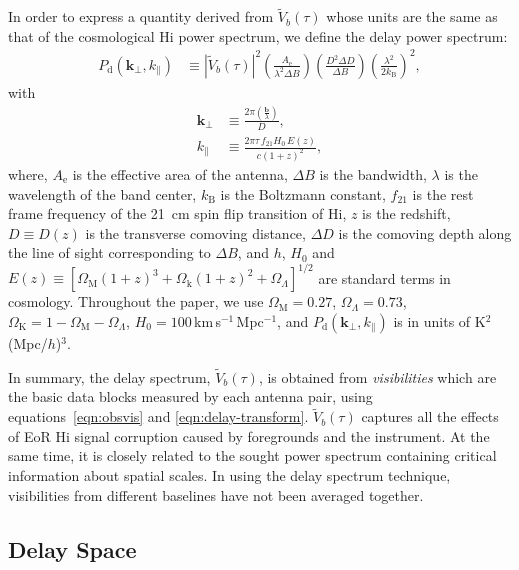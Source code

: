 \documentclass[preprint2,iop,numberedappendix,twocolappendix,appendixfloats]{emulateapj}
\begin{document}
In order to express a quantity derived from $\tilde{V}_b(\tau)$ whose units are the same as that of the cosmological H{\sc i} power spectrum, we define the delay power spectrum:
\begin{align}\label{eqn:delay-power-spectrum}
  P_\textrm{d}(\boldsymbol{k}_\perp,k_\parallel) &\equiv |\tilde{V}_b(\tau)|^2\left(\frac{A_\textrm{e}}{\lambda^2\Delta B}\right)\left(\frac{D^2\Delta D}{\Delta B}\right)\left(\frac{\lambda^2}{2k_\textrm{B}}\right)^2,
\end{align}
with
\begin{align}
  \boldsymbol{k}_\perp &\equiv \frac{2\pi(\frac{\boldsymbol{b}}{\lambda})}{D}, \\
  k_\parallel &\equiv \frac{2\pi\tau\,f_{21}H_0\,E(z)}{c(1+z)^2}, 
\end{align}
where, $A_\textrm{e}$ is the effective area of the antenna, $\Delta B$ is the bandwidth, $\lambda$ is the wavelength of the band center, $k_\textrm{B}$ is the Boltzmann constant, $f_{21}$ is the rest frame frequency of the 21~cm spin flip transition of H{\sc i}, $z$ is the redshift, $D\equiv D(z)$ is the transverse comoving distance, $\Delta D$ is the comoving depth along the line of sight corresponding to $\Delta B$, and $h$, $H_0$ and $E(z)\equiv [\Omega_\textrm{M}(1+z)^3+\Omega_\textrm{k}(1+z)^2+\Omega_\Lambda]^{1/2}$ are standard terms in cosmology. Throughout the paper, we use $\Omega_\textrm{M}=0.27$, $\Omega_\Lambda=0.73$, $\Omega_\textrm{K}=1-\Omega_\textrm{M}-\Omega_\Lambda$, $H_0=100\,$km$\,$s$^{-1}\,$Mpc$^{-1}$, and $P_\textrm{d}(\boldsymbol{k}_\perp,k_\parallel)$ is in units of K$^2$(Mpc/$h$)$^3$.

In summary, the delay spectrum, $\tilde{V}_b(\tau)$, is obtained from {\it visibilities} which are the basic data blocks measured by each antenna pair, using equations~\ref{eqn:obsvis} and \ref{eqn:delay-transform}. $\tilde{V}_b(\tau)$ captures all the effects of EoR H{\sc i} signal corruption caused by foregrounds and the instrument. At the same time, it is closely related to the sought power spectrum containing critical information about spatial scales. In using the delay spectrum technique, visibilities from different baselines have not been averaged together. 

\subsection{Delay Space}\label{sec:delay-space}
\end{document}
